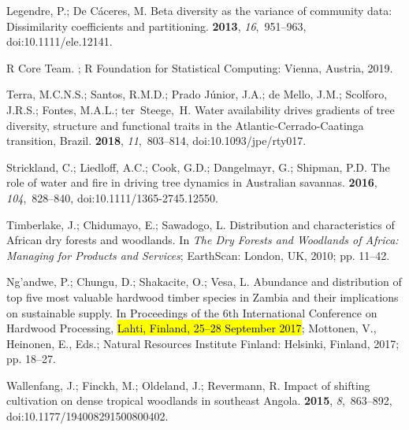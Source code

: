 \documentclass[diversity,article,accept,moreauthors,pdftex]{Definitions/mdpi}
\begin{document}
\begin{thebibliography}{999}
Legendre, P.; {De C{\'a}ceres}, M.
\newblock Beta diversity as the variance of community data: Dissimilarity
  coefficients and partitioning.
 {\bf 2013}, {\em 16},~951--963, doi:10.1111/ele.12141.

{R Core Team}.
;
\newblock R Foundation for Statistical Computing: Vienna, Austria,  2019.

Terra, M.C.N.S.; Santos, R.M.D.; {Prado J{\'u}nior}, J.A.; {de Mello}, J.M.;
  Scolforo, J.R.S.; Fontes, M.A.L.; {ter~Steege},~H.
\newblock Water availability drives gradients of tree diversity, structure and
  functional traits in the {Atlantic-Cerrado-Caatinga} transition, {Brazil}.
 {\bf 2018}, {\em 11},~803--814, doi:10.1093/jpe/rty017.

Strickland, C.; Liedloff, A.C.; Cook, G.D.; Dangelmayr, G.; Shipman, P.D.
\newblock The role of water and fire in driving tree dynamics in {Australian}
  savannas.
 {\bf 2016}, {\em 104},~828--840, doi:10.1111/1365-2745.12550.

Timberlake, J.; Chidumayo, E.; Sawadogo, L.
\newblock Distribution and characteristics of {African} dry forests and
  woodlands. In {\em The Dry Forests and Woodlands of Africa: Managing for
  Products and Services}; EarthScan: London, UK,  2010; pp. 11--42.

{Ng'andwe}, P.; Chungu, D.; Shakacite, O.; Vesa, L.
\newblock Abundance and distribution of top five most valuable hardwood timber
  species in {Zambia} and their implications on sustainable supply.
\newblock In {Proceedings of the} 6th International Conference on Hardwood Processing,  \hl{Lahti, Finland, 25--28 September 2017}; %
  Mottonen, V., Heinonen, E., Eds.; Natural Resources Institute
  Finland: Helsinki, Finland, 2017; pp. 18--27.

Wallenfang, J.; Finckh, M.; Oldeland, J.; Revermann, R.
\newblock Impact of shifting cultivation on dense tropical woodlands in
  southeast {Angola}.
 {\bf 2015}, {\em 8},~863--892, doi:10.1177/194008291500800402.


\end{thebibliography}
\end{document}
